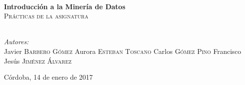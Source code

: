 \begin{titlepage}
  \HRule \\[0.4cm]
  { \huge \bfseries Introducción a la Minería de Datos}\\[0.4cm] %
  \textsc{\large Prácticas de la asignatura}\\[0.5cm]
  \HRule \\[1.5cm]
  
  
      \begin{minipage}{0.4\textwidth}
        \begin{flushleft} \large
          \emph{Autores:}\\
          Javier \textsc{Barbero Gómez}
          Aurora \textsc{Esteban Toscano}
          Carlos \textsc{Gómez Pino}
          Francisco Jesús \textsc{Jiménez Álvarez}
        \end{flushleft}
      \end{minipage}
  


{\large Córdoba, 14 de enero de 2017}\\[2cm] %




\vfill %

\end{titlepage}
